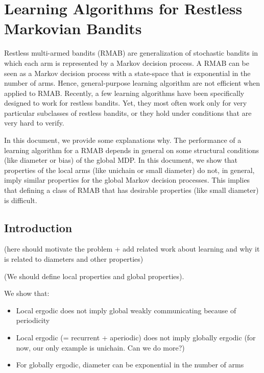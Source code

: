 \begingroup
\chapter{Learning Algorithms for Restless Markovian Bandits}
\label{ch:learning_restless}



Restless multi-armed bandits (RMAB) are generalization of stochastic bandits in which each arm is represented by a Markov decision process. A RMAB can be seen as a Markov decision process with a state-space that is exponential in the number of arms. Hence, general-purpose learning algorithm are not efficient when applied to RMAB. Recently, a few learning algorithms have been specifically designed to work for restless bandits. Yet, they most often work only for very particular subclasses of restless bandits, or they hold under conditions that are very hard to verify.
    
In this document, we provide some explanations why. The performance of a learning algorithm for a RMAB depends in general on some structural conditions (like diameter or bias) of the global MDP.  In this document, we show that properties of the local arms (like unichain or small diameter) do not, in general, imply similar properties for the global Markov decision processes.  This implies that defining a class of RMAB that has desirable properties (like small diameter) is difficult. 

\section{Introduction}

(here should motivate the problem + add related work about learning and why it is related to diameters and other properties)

(We should define local properties and global properties).

We show that:
\begin{itemize}
    \item Local ergodic does not imply global weakly communicating because of periodicity 
    \item Local ergodic (= recurrent + aperiodic) does not imply globally ergodic (for now, our only example is unichain. Can we do more?)
    \item For globally ergodic, diameter can be exponential in the number of arms
\end{itemize}

